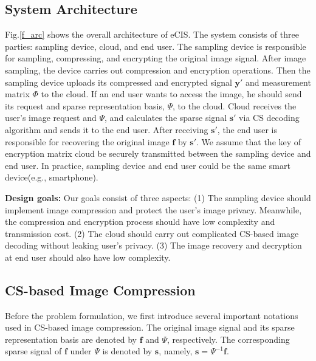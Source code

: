 \documentclass[conference]{IEEEtran}
\begin{document}
\subsection{System Architecture}
Fig.\ref{f_arc} shows the overall architecture of eCIS. The system consists of three parties: sampling device, cloud, and end user.
The sampling device is responsible for sampling, compressing, and encrypting the original image signal. After image sampling, the device carries out compression and encryption operations.  Then the sampling device uploads its compressed and encrypted signal $\mathbf{y}'$ and  measurement matrix $\Phi$ to the cloud. If an end user wants to access the image, he should send its request and sparse representation basis, $\Psi$, to the cloud. Cloud receives the user's image request and $\Psi$, and calculates the sparse signal $\mathbf{s}'$ via CS decoding algorithm and sends it to the end user.
After receiving $\mathbf{s}'$, the end user is responsible for recovering the original image $\mathbf{f}$  by $\mathbf{s}'$.
We assume that the key of encryption matrix cloud be securely transmitted between the sampling device and end user. In practice,  sampling device and end user could be the same smart device(e.g., smartphone).


\textbf{Design goals:}
Our goals  consist of three aspects:
(1) The sampling device should implement image compression and protect the user's image privacy. Meanwhile, the compression and encryption process should have low complexity and transmission cost.
(2) The cloud  should carry out complicated CS-based image decoding without leaking user's privacy.
(3) The image recovery and decryption at end user should also have low complexity.

\subsection{CS-based Image Compression}
Before the problem formulation, we first introduce several important notations used in CS-based image compression. The original image signal and its sparse representation basis are denoted by $\mathbf{f}$ and $\Psi$, respectively. The corresponding sparse signal of $\mathbf{f}$ under $\Psi$ is denoted by $\mathbf{s}$, namely, $\mathbf{s}=\Psi^{-1}\mathbf{f}$.
\end{document}
